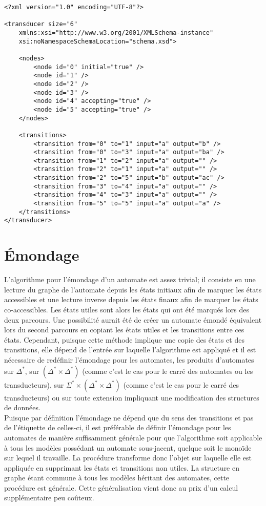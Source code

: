 	\begin{lstlisting}[caption={Fichier XML pour l'exemple de la figure~\ref{ex1}}, label={ex2}]
<?xml version="1.0" encoding="UTF-8"?>

<transducer size="6" 
	xmlns:xsi="http://www.w3.org/2001/XMLSchema-instance" 
	xsi:noNamespaceSchemaLocation="schema.xsd">

	<nodes>
		<node id="0" initial="true" />
		<node id="1" />
		<node id="2" />
		<node id="3" />
		<node id="4" accepting="true" />
		<node id="5" accepting="true" />
	</nodes>

	<transitions>
		<transition from="0" to="1" input="a" output="b" />
		<transition from="0" to="3" input="a" output="ba" />
		<transition from="1" to="2" input="a" output="" />
		<transition from="2" to="1" input="a" output="" />
		<transition from="2" to="5" input="b" output="ac" />
		<transition from="3" to="4" input="a" output="" />
		<transition from="4" to="3" input="a" output="" />
		<transition from="5" to="5" input="a" output="a" />
	</transitions>
</transducer>
	\end{lstlisting}
	
\section{\'{E}mondage}
\label{emondage}

	L'algorithme pour l'émondage d'un automate est assez trivial; il consiste en une lecture du graphe de l'automate depuis les états initiaux afin de marquer les états accessibles et une lecture inverse depuis les états finaux afin de marquer les états co-accessibles. Les états utiles sont alors les états qui ont été marqués lors des deux parcours. Une possibilité aurait été de créer un automate émondé équivalent lors du second parcours en copiant les états utiles et les transitions entre ces états. Cependant, puisque cette méthode implique une copie des états et des transitions, elle dépend de l'entrée sur laquelle l'algorithme est appliqué et il est nécessaire de redéfinir l'émondage pour les automates, les produits d'automates sur $\Delta^*$, sur $(\Delta^* \times \Delta^*)$ (comme c'est le cas pour le carré des automates ou les transducteurs), sur $\Sigma^* \times (\Delta^* \times \Delta^*)$ (comme c'est le cas pour le carré des transducteurs) ou sur toute extension impliquant une modification des structures de données. \\
	Puisque par définition l'émondage ne dépend que du sens des transitions et pas de l'étiquette de celles-ci, il est préférable de définir l'émondage pour les automates de manière suffisamment générale pour que l'algorithme soit applicable à tous les modèles possédant un automate sous-jacent, quelque soit le monoïde sur lequel il travaille. La procédure transforme donc l'objet sur laquelle elle est appliquée en supprimant les états et transitions non utiles. La structure en graphe étant commune à tous les modèles héritant des automates, cette procédure est générale. Cette généralisation vient donc au prix d'un calcul supplémentaire peu coûteux.
	
